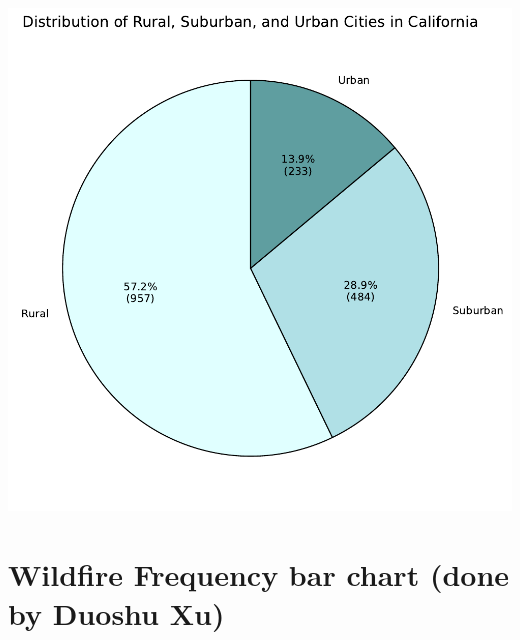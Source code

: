 \documentclass[
  letterpaper,
  DIV=11,
  numbers=noendperiod]{scrartcl}
\begin{document}
\includegraphics{Final Code_files/figure-pdf/cell-6-output-1.pdf}

\section{Wildfire Frequency bar chart (done by Duoshu
Xu)}\label{wildfire-frequency-bar-chart-done-by-duoshu-xu}
\end{document}
